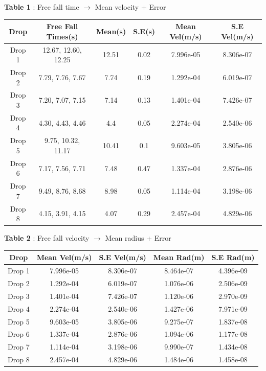\documentclass{article}
\title{}
\date{}
\author{}
\begin{document}
\textbf{Table 1} : Free fall time $\rightarrow$ Mean velocity + Error

\begin{tabular}{|c|c|S|S|S|S|}
  \hline
  \textbf{Drop} & \textbf{Free Fall Times(s)} & \textbf{Mean(s)} & \textbf{S.E(s)} & \textbf{Mean Vel(m/s)} & \textbf{S.E Vel(m/s)} \\
  \hline
  Drop 1 & 12.67, 12.60, 12.25 & 12.51 & 0.02 & 7.996e-05 & 8.306e-07 \\
  Drop 2 & 7.79, 7.76, 7.67 & 7.74 & 0.19 & 1.292e-04 & 6.019e-07 \\
  Drop 3 & 7.20, 7.07, 7.15 & 7.14 & 0.13 & 1.401e-04 & 7.426e-07 \\
  Drop 4 & 4.30, 4.43, 4.46 & 4.4 & 0.05 & 2.274e-04 & 2.540e-06 \\
  Drop 5 & 9.75, 10.32, 11.17 & 10.41 & 0.1 & 9.603e-05 & 3.805e-06 \\
  Drop 6 & 7.17, 7.56, 7.71 & 7.48 & 0.47 & 1.337e-04 & 2.876e-06 \\
  Drop 7 & 9.49, 8.76, 8.68 & 8.98 & 0.05 & 1.114e-04 & 3.198e-06 \\
  Drop 8 & 4.15, 3.91, 4.15 & 4.07 & 0.29 & 2.457e-04 & 4.829e-06 \\
  \hline
\end{tabular}

\vspace{20pt}

\textbf{Table 2} : Free fall velocity $\rightarrow$ Mean radius + Error

\begin{tabular}{|c|c|S|S|S|}
  \hline
  \textbf{Drop} & \textbf{Mean Vel(m/s)} & \textbf{S.E Vel(m/s)} & \textbf{Mean Rad(m)} & \textbf{S.E Rad(m)} \\
  \hline
  Drop 1 & 7.996e-05 & 8.306e-07 & 8.464e-07 & 4.396e-09 \\
  Drop 2 & 1.292e-04 & 6.019e-07 & 1.076e-06 & 2.506e-09 \\
  Drop 3 & 1.401e-04 & 7.426e-07 & 1.120e-06 & 2.970e-09 \\
  Drop 4 & 2.274e-04 & 2.540e-06 & 1.427e-06 & 7.971e-09 \\
  Drop 5 & 9.603e-05 & 3.805e-06 & 9.275e-07 & 1.837e-08 \\
  Drop 6 & 1.337e-04 & 2.876e-06 & 1.094e-06 & 1.177e-08 \\
  Drop 7 & 1.114e-04 & 3.198e-06 & 9.990e-07 & 1.434e-08 \\
  Drop 8 & 2.457e-04 & 4.829e-06 & 1.484e-06 & 1.458e-08 \\
  \hline
\end{tabular}
\end{document}

